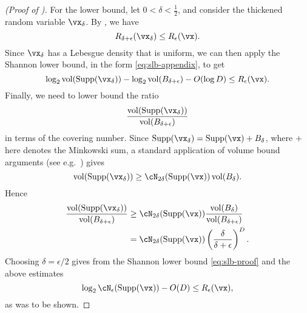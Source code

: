 \documentclass[../../book-main.tex]{subfiles}
\begin{document}
\begin{proof}[(Proof of )]
    For the lower bound, let $0 < \delta < \tfrac{1}{2}$, and consider the
    thickened random variable $\vx_{\delta}$. By
    , we have
    \begin{equation}
        R_{\delta + \epsilon}(\vx_{\delta})
        \leq
        R_{\epsilon}(\vx).
    \end{equation}
    Since $\vx_{\delta}$ has a Lebesgue density that is uniform, we can then
    apply the Shannon lower bound, in the form \eqref{eq:slb-appendix}, to get
    \begin{equation}\label{eq:slb-proof}
        \log_2 \volume(\Supp(\vx_{\delta}))
        - \log_2 \volume(B_{\delta + \epsilon})
        - O(\log D)
        \leq
        R_{\epsilon}(\vx).
    \end{equation}
    Finally, we need to lower bound the ratio
    \begin{equation}
        \frac{
            \volume(\Supp(\vx_{\delta}))
        }
        {
            \volume(B_{\delta + \epsilon})
        }
    \end{equation}
    in terms of the covering number.
    Since $\Supp(\vx_{\delta}) = \Supp(\vx) + B_{\delta}$, where $+$ here
    denotes the Minkowski sum, a standard application of volume bound arguments
    (see e.g.\ \cite[Proposition 4.2.12]{Vershynin2018-br}) gives
    \begin{equation}
        \volume(\Supp(\vx_{\delta}))
        \geq
        \cN_{2\delta}(\Supp(\vx))
        \volume(B_{\delta}).
    \end{equation}
    Hence
    \begin{align}
        \frac{
            \volume(\Supp(\vx_{\delta}))
        }
        {
            \volume(B_{\delta + \epsilon})
        }
        &\geq
        \cN_{2\delta}(\Supp(\vx))
        \frac{
            \volume(B_{\delta})
        }
        {
            \volume(B_{\delta + \epsilon})
        }
        \\
        &=
        \cN_{2\delta}(\Supp(\vx))
        \left(
            \frac{
                \delta
            } 
            {
                \delta + \epsilon
            }
        \right)^D.
    \end{align}
    Choosing $\delta = \epsilon / 2$ gives from the Shannon lower bound
    \eqref{eq:slb-proof} and the above estimates
    \begin{equation}
        \log_2 \cN_{\epsilon}(\Supp(\vx))
        - O(D)
        \leq
        R_{\epsilon}(\vx),
    \end{equation}
    as was to be shown.

\end{proof}
\end{document}
